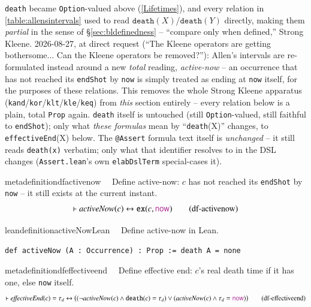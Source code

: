 \pn \texttt{death} became \texttt{Option}-valued above (\ref{Lifetimes}), and every relation in
\ref{table:allensintervals} used to read $\texttt{death}(X)$/$\texttt{death}(Y)$ directly, making them
\emph{partial} in the sense of \S\ref{sec:bldefinedness} -- ``compare only when defined,'' Strong Kleene.
2026-08-27, at direct request (``The Kleene operators are getting bothersome... Can the Kleene operators be
removed?''): Allen's intervals are re-formulated instead around a new \emph{total} reading, \textit{active-now}
-- an occurrence that has not reached its \texttt{endShot} by \texttt{now} is simply treated as ending at
\texttt{now} itself, for the purposes of these relations. This removes the whole Strong Kleene apparatus
(\texttt{kand}/\texttt{kor}/\texttt{klt}/\texttt{kle}/\texttt{keq}) from \emph{this} section entirely -- every
relation below is a plain, total \texttt{Prop} again. \texttt{death} itself is untouched (still
\texttt{Option}-valued, still faithful to \texttt{endShot}); only what \textit{these formulas} mean by
``\texttt{death}(X)'' changes, to \texttt{effectiveEnd}(X) below. The \texttt{@Assert} formula text itself is
\emph{unchanged} -- it still reads \texttt{death(x)} verbatim; only what that identifier resolves to in the DSL
changes (\texttt{Assert.lean}'s own \texttt{elabDslTerm} special-cases it).

\begin{restatable}{metadefinition}{dfactivenow}~~ Define active-now: $c$ has not reached
its \texttt{endShot} by \texttt{now} -- it still exists at the current instant.
\begin{align}
\vdash \textit{activeNow}(c) \leftrightarrow \texttt{ex}(c,\mathsf{\mc{now}})
\label{eq:df-activenow}\tag{df-activenow}
\end{align}
\end{restatable}

\begin{restatable}{leandefinition}{activeNowLean}~~ Define active-now in Lean.

\texttt{\textcolor{leancolor}{def} \textcolor{leanyellow}{activeNow} (A : Occurrence) : Prop := death A = none}
\label{activeNow}
\end{restatable}

\begin{restatable}{metadefinition}{dfeffectiveend}~~ Define effective end: $c$'s real
death time if it has one, else \texttt{now} itself.
\begin{align}
\vdash \textit{effectiveEnd}(c) = \tau_d \leftrightarrow \big( ( \lnot\textit{activeNow}(c) \wedge \texttt{death}(c) = \tau_d )
  \vee ( \textit{activeNow}(c) \wedge \tau_d = \mathsf{\mc{now}} ) \big)
\label{eq:df-effectiveend}\tag{df-effectiveend}
\end{align}
\end{restatable}

